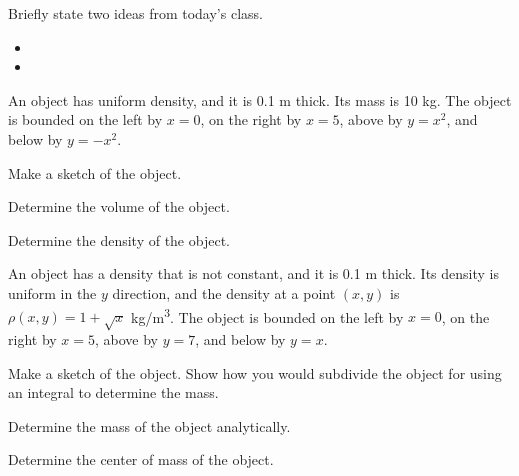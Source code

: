 \begin{problem}
\item Briefly state two ideas from today's class.
  \begin{itemize}
  \item
  \item
  \end{itemize}
\item An object has uniform density, and it is 0.1 m thick. Its mass
  is 10 kg. The object is bounded on the left by $x=0$, on the right
  by $x=5$, above by $y=x^2$, and below by $y=-x^2$.
  \begin{subproblem}
    \item Make a sketch of the object.
      \vfill
    \item Determine the volume of the object.
      \vfill
    \item Determine the density of the object.
      \vfill
  \end{subproblem}
  \clearpage

\item An object has a density that is not constant, and it is 0.1 m
  thick. Its density is uniform in the $y$ direction, and the density
  at a point $(x,y)$ is $\rho(x,y)=1+\sqrt{x}$
  kg/m\textsuperscript{3}. The object is bounded on the left by $x=0$,
  on the right by $x=5$, above by $y=7$, and below by $y=x$.
  \begin{subproblem}
    \item Make a sketch of the object. Show how you would subdivide
      the object for using an integral to determine the mass.
      \vfill
    \item Determine the mass of the object analytically.
      \vfill
    \item Determine the center of mass of the object.
      \vfill
  \end{subproblem}
\end{problem}


